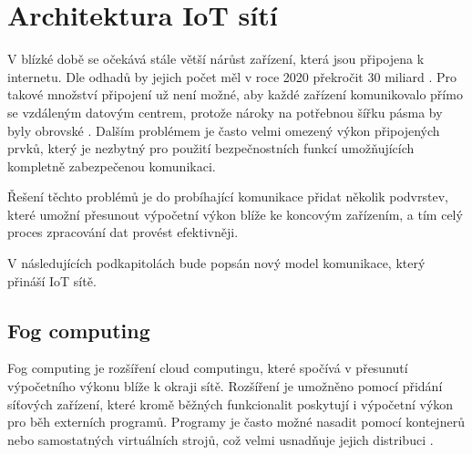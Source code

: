 \section{Architektura IoT sítí}
  V blízké době se očekává stále větší nárůst zařízení, která jsou připojena k internetu.
  Dle odhadů by jejich počet měl v roce 2020 překročit 30 miliard \cite{iotDevices}.
  Pro takové množství připojení už není možné, aby každé zařízení komunikovalo přímo
  se vzdáleným datovým centrem, protože nároky na potřebnou šířku pásma by byly 
  obrovské \cite{fog}.
  Dalším problémem je často velmi omezený výkon připojených prvků, který je nezbytný pro 
  použití bezpečnostních funkcí umožňujících kompletně zabezpečenou komunikaci. 
  
  Řešení těchto problémů je do probíhající komunikace přidat několik podvrstev, 
  které umožní přesunout výpočetní výkon blíže ke koncovým zařízením, a tím celý
  proces zpracování dat provést efektivněji.
  
  V následujících podkapitolách bude popsán nový model komunikace, který přináší 
  IoT sítě.
 \subsection{Fog computing} 
 Fog computing je rozšíření cloud computingu, které spočívá v přesunutí výpočetního
 výkonu blíže k okraji sítě. Rozšíření je umožněno pomocí přidání síťových zařízení,
 které kromě běžných funkcionalit poskytují i výpočetní výkon pro běh externích programů. Programy 
 je často možné nasadit pomocí kontejnerů nebo samostatných virtuálních strojů, což 
 velmi usnadňuje jejich distribuci \cite{fog}.
 

